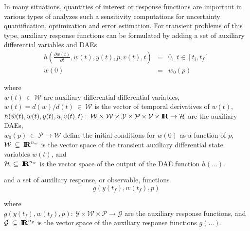 \documentclass[pdf,ps2pdf,11pt]{SANDreport}
\begin{document}
In many situations, quantities of interest or response functions are important
in various types of analyzes such a sensitivity computations for uncertainty
quantification, optimization and error estimation.  For transient problems of
this type, auxiliary response functions can be formulated by adding a set of
auxiliary differential variables and DAEs
%
\begin{eqnarray}
h\left( \frac{\partial w(t)}{\partial t}, w(t), y(t), p, v(t), t \right) & = & 0,
\; t \in \left[ t_i, t_f \right] \label{rythmos:eqn:app:h} \\
w(0) & = & w_0(p) \label{rythmos:eqn:app:h:ic}
\end{eqnarray}
\begin{tabbing}
\hspace{4ex}where\hspace{1ex}\= \\
\>	$w(t) \:\in\:\mathcal{W}$ are auxiliary differential differential variables, \\
\>	$\dot{w}(t) = d(w)/d(t)\:\in\:\mathcal{W}$ is the vector of temporal derivatives of $w(t)$, \\
\>	$h(\dot{w}(t), w(t), y(t), u, v(t), t) : \:
 		\mathcal{W} \times \mathcal{W} \times \mathcal{Y} \times \mathcal{P} \times \mathcal{V} \times \mbox{\textbf{I}}\hspace{-0.6ex}\mbox{\textbf{R}}
		\rightarrow \mathcal{H}$ are the auxiliary DAEs, \\
\>	$w_0(p) \:\in\:\mathcal{P} \rightarrow \mathcal{W}$ define the initial conditions for $w(0)$ as a function of $p$, \\
\>	$\mathcal{W} \:\subseteq\:\mbox{\textbf{I}}\hspace{-0.6ex}\mbox{\textbf{R}}^{n_w}$ is the vector space of the transient auxiliary differential state variables $w(t)$, and \\
\>	$\mathcal{H} \:\subseteq\:\mbox{\textbf{I}}\hspace{-0.6ex}\mbox{\textbf{R}}^{n_w}$ is the vector space of the output of the DAE function $h(\ldots)$.
\end{tabbing}
%
and a set of auxiliary response, or observable, functions
%
\begin{equation}
g(y(t_f),w(t_f),p)
\label{rythmos:eqn:app:g}
\end{equation}
\begin{tabbing}
\hspace{4ex}where\hspace{1ex}\= \\
\>	$g(y(t_f),w(t_f),p) : \:
		\mathcal{Y} \times \mathcal{W} \times \mathcal{P}
		\rightarrow \mathcal{G}$ are the auxiliary response functions, and \\ 
\>	$\mathcal{G} \:\subseteq\:\mbox{\textbf{I}}\hspace{-0.6ex}\mbox{\textbf{R}}^{n_g}$ is the vector space of the auxiliary response functions $g(\ldots)$.
\end{tabbing}
\end{document}
